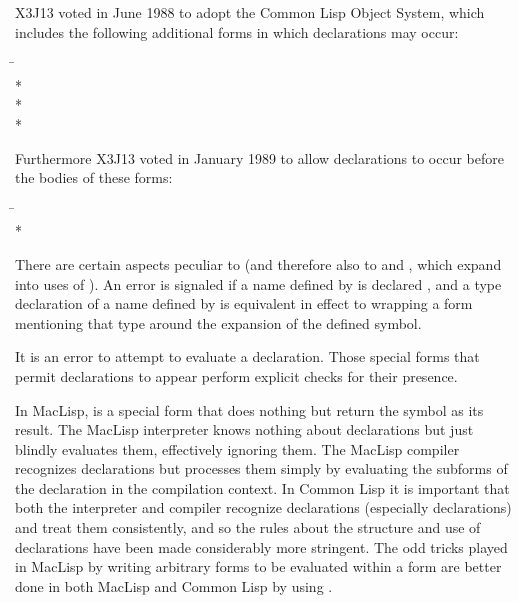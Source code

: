 \begin{defspec}
\begin{new}
X3J13 voted in June 1988
to adopt the Common Lisp Object System,
which includes the following additional forms in which declarations
may occur:
\begin{lisp}
\hskip 12pc\=\kill
{}\> \\*
\> \\*
\> \\*
\end{lisp}
Furthermore X3J13 voted in January 1989
to allow declarations to
occur before the bodies of these forms:
\begin{lisp}
\hskip 12pc\=\kill
{}\> \\*
\end{lisp}
There are certain aspects peculiar to 
(and therefore also to  and ,
which expand into uses of ).
An error is signaled if a name defined by 
is declared , and a type declaration of a name
defined by  is equivalent in effect
to wrapping a  form mentioning that type around
the expansion of the defined symbol.
\end{new}

It is an error to attempt to evaluate a declaration.
Those special forms that permit declarations to appear
perform explicit checks for their presence.

\beforenoterule
\begin{incompatibility}
In MacLisp,  is a special form
that does nothing but return the symbol  as its
result.  The MacLisp interpreter knows nothing about declarations
but just blindly evaluates them, effectively ignoring them.
The MacLisp compiler recognizes declarations but processes
them simply by evaluating the subforms of the declaration in
the compilation context.  In Common Lisp it is
important that both the interpreter and compiler recognize
declarations (especially  declarations) and treat them
consistently,
and so the rules about the structure and use of declarations
have been made considerably more stringent.
The odd tricks played in MacLisp by writing arbitrary forms
to be evaluated within a  form
are better done in both MacLisp and Common Lisp by using .
\end{incompatibility}
\afternoterule


\end{defspec}

